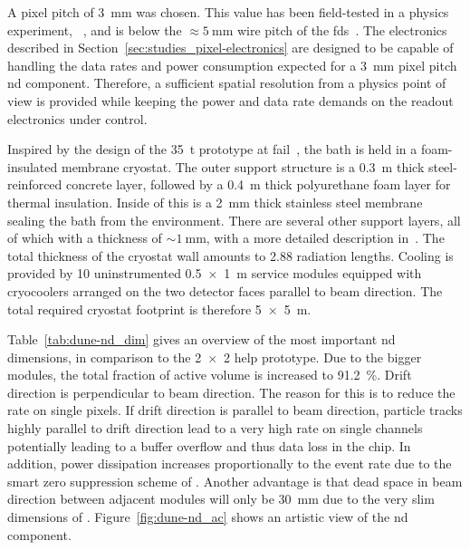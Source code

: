 A pixel pitch of \SI{3}{\milli\metre} was chosen.
This value has been field-tested in a physics experiment, \uboone{}~\cite{uboone}, and is below the $\approx \SI{5}{\milli\metre}$ wire pitch of the \dune{} \glspl{fd}~\cite{dune4}.
The \larpix{} electronics described in Section~\ref{sec:studies_pixel-electronics} are designed to be capable of handling the data rates and power consumption expected for a \SI{3}{\milli\metre} pixel pitch \AC{} \gls{nd} component.
Therefore, a sufficient spatial resolution from a physics point of view is provided while keeping the power and data rate demands on the readout electronics under control.

Inspired by the design of the \dune{} \SI{35}{\tonne} prototype at \gls{fail}~\cite{dune4}, the \lar{} bath is held in a foam-insulated membrane cryostat.
The outer support structure is a \SI{0.3}{\metre} thick steel-reinforced concrete layer, followed by a \SI{0.4}{\metre} thick polyurethane foam layer for thermal insulation.
Inside of this is a \SI{2}{\milli\metre} thick stainless steel membrane sealing the \lar{} bath from the environment.
There are several other support layers, all of which with a thickness of $\sim{\SI{1}{\milli\metre}}$, with a more detailed description in~\cite{dune4}.
The total thickness of the cryostat wall amounts to \num{2.88} radiation lengths.
Cooling is provided by \num{10} uninstrumented \SI{0.5 x 1}{\metre} service modules equipped with cryocoolers arranged on the two detector faces parallel to beam direction.
The total required cryostat footprint is therefore \SI{5 x 5}{\metre}.

Table~\ref{tab:dune-nd_dim} gives an overview of the most important \AC{} \gls{nd} dimensions, in comparison to the \num{2 x 2} \gls{help} prototype.
Due to the bigger modules, the total fraction of active volume is increased to \SI{91.2}{\percent}.
Drift direction is perpendicular to beam direction.
The reason for this is to reduce the rate on single pixels.
If drift direction is parallel to beam direction, particle tracks highly parallel to drift direction lead to a very high rate on single channels potentially leading to a buffer overflow and thus data loss in the \larpix{} chip.
In addition, power dissipation increases proportionally to the event rate due to the smart zero suppression scheme of \larpix{}.
Another advantage is that dead space in beam direction between adjacent modules will only be \SI{30}{\milli\metre} due to the very slim dimensions of \AL{}.
Figure~\ref{fig:dune-nd_ac} shows an artistic view of the \AC{} \gls{nd} component.